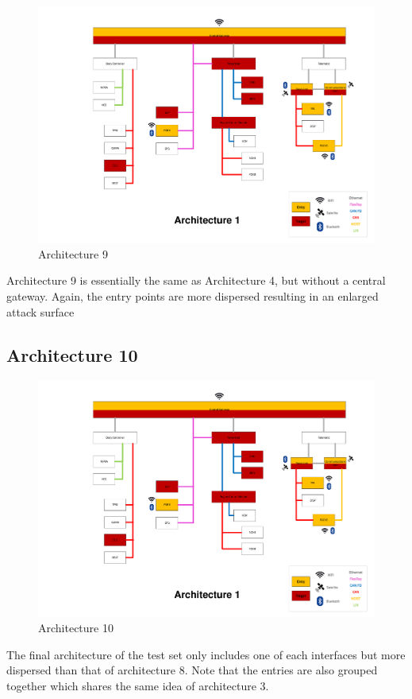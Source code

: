 \begin{figure}[h!]
    \caption{Architecture 9}
    \includegraphics[width=\textwidth, page=9]{../Architectures-survey.pdf}
\end{figure}

Architecture 9 is essentially the same as Architecture 4, but without a central gateway.
Again, the entry points are more dispersed resulting in an enlarged attack surface \par


\subsection*{Architecture 10}
\label{sec:arch10}

\begin{figure}[h!]
    \caption{Architecture 10}
    \includegraphics[width=\textwidth, page=10]{../Architectures-survey.pdf}
\end{figure}

The final architecture of the test set only includes one of each interfaces but more dispersed than that of architecture 8.
Note that the entries are also grouped together which shares the same idea of architecture 3.\\
